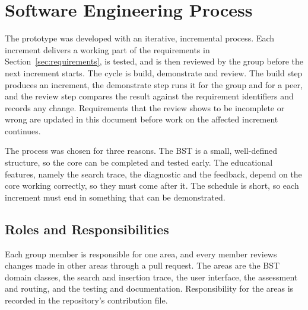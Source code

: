\section{Software Engineering Process}\label{sec:process}


The prototype was developed with an iterative, incremental process. Each increment delivers a working part of the requirements in Section~\ref{sec:requirements}, is tested, and is then reviewed by the group before the next increment starts. The cycle is build, demonstrate and review. The build step produces an increment, the demonstrate step runs it for the group and for a peer, and the review step compares the result against the requirement identifiers and records any change. Requirements that the review shows to be incomplete or wrong are updated in this document before work on the affected increment continues.

The process was chosen for three reasons. The BST is a small, well-defined structure, so the core can be completed and tested early. The educational features, namely the search trace, the diagnostic and the feedback, depend on the core working correctly, so they must come after it. The schedule is short, so each increment must end in something that can be demonstrated.

\subsection{Roles and Responsibilities}
Each group member is responsible for one area, and every member reviews changes made in other areas through a pull request. The areas are the BST domain classes, the search and insertion trace, the user interface, the assessment and routing, and the testing and documentation. Responsibility for the areas is recorded in the repository's contribution file. 


